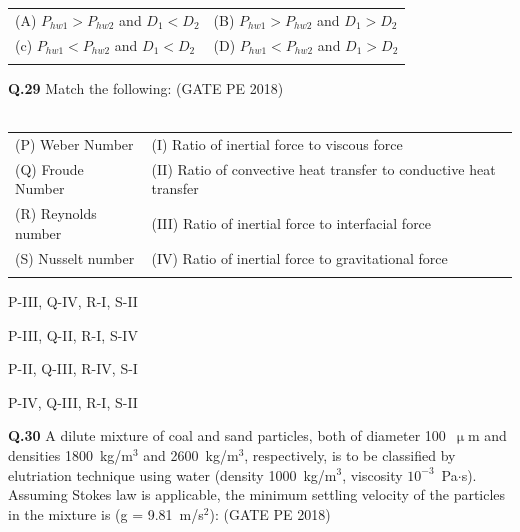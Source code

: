 \documentclass[12pt,a4paper]{article}
\begin{document}
\begin{center}
	\begin{tabular}{ll}	
		(A) $P_{hw1} > P_{hw2}$ and $D_1 < D_2$ & (B) $P_{hw1} > P_{hw2}$ and $D_1 > D_2$\\
		(c) $P_{hw1} < P_{hw2}$ and $D_1<D_2$ & (D)  $P_{hw1} < P_{hw2}$ and $D_1 > D_2$\\\\
	\end{tabular}
\end{center}


\pagebreak

\noindent\textbf{Q.29} Match the following: \hfill (GATE PE 2018)\\\\

\begin{tabular}{ll}
(P) Weber Number      & (I) Ratio of inertial force to viscous force \\
(Q) Froude Number     & (II) Ratio of convective heat transfer to conductive heat transfer \\
(R) Reynolds number   & (III) Ratio of inertial force to interfacial force \\
(S) Nusselt number    & (IV) Ratio of inertial force to gravitational force \\\\
\end{tabular}



\begin{enumerate}[label=(\Alph*)] 
\begin{multicols}{2}

\item P-III, Q-IV, R-I, S-II \item P-III, Q-II, R-I, S-IV 
\item P-II, Q-III, R-IV, S-I \item P-IV, Q-III, R-I, S-II 
\end{multicols}
\end{enumerate}

\vspace{1cm}

\noindent\textbf{Q.30} A dilute mixture of coal and sand particles, both of diameter 100~$\upmu$m and densities 1800~kg/m$^3$ and 2600~kg/m$^3$, respectively, is to be classified by elutriation technique using water (density 1000~kg/m$^3$, viscosity $10^{-3}$~Pa$\cdot$s). Assuming Stokes law is applicable, the minimum settling velocity of the particles in the mixture is (g = 9.81~m/s$^2$): \hfill (GATE PE 2018)
\end{document}
